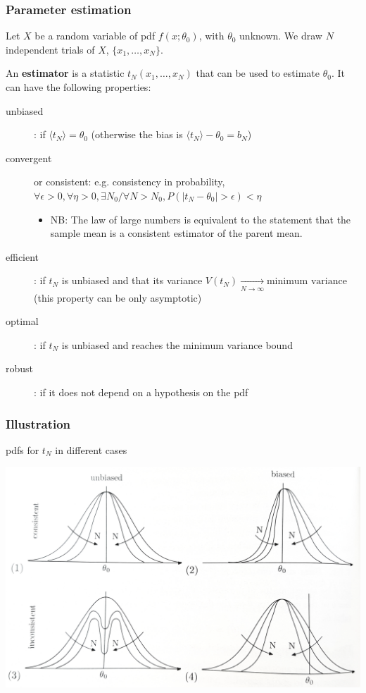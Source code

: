 \documentclass[9pt]{beamer}
\begin{document}
\begin{frame}
 \frametitle{Parameter estimation}
 
 Let $X$ be a random variable of pdf $f(x;\theta_0)$, with $\theta_0$ unknown. We draw $N$ independent trials of $X$, $\{x_1,\dots,x_N\}$.
 
 
 An \textbf{estimator} is a statistic $t_N(x_1,\dots,x_N)$ that can be used to estimate $\theta_0$. It can have the following properties:
 
 \begin{description}
  \item[unbiased]: if $\langle t_N \rangle = \theta_0$ (otherwise the bias is $\langle t_N \rangle - \theta_0 = b_N$)
  \item[convergent] or consistent: e.g. consistency in probability, $\forall \epsilon>0, \forall \eta>0, \exists N_0 / \forall N>N_0, P(|t_N - \theta_0|>\epsilon)<\eta$
  \begin{itemize}
   \item NB: The law of large numbers is equivalent to the statement that the sample mean is a consistent estimator of the parent mean.
  \end{itemize}
  \item[efficient]: if $t_N$ is unbiased and that its variance $V(t_N) \xrightarrow[N\to\infty]{} \text{minimum variance}$ (this property can be only asymptotic)
  \item[optimal]: if $t_N$ is unbiased and reaches the minimum variance bound
  \item[robust]: if it does not depend on a hypothesis on the pdf
 \end{description}

\end{frame}

\begin{frame}
 \frametitle{Illustration}
 
 pdfs for $t_N$ in different cases
 
 \includegraphics[width=\textwidth]{estimators.jpg}
\end{frame}
\end{document}

